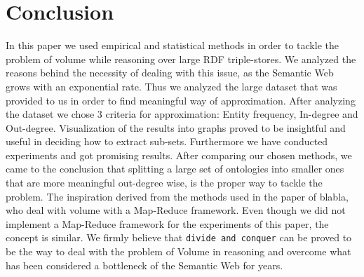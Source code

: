 \documentclass[runningheads,a4paper]{../../StyleFiles/llncs}
\begin{document}
\section{Conclusion}
In this paper we used empirical and statistical methods in order to tackle the problem of volume while reasoning over large RDF triple-stores. We analyzed the reasons behind the necessity of dealing with this issue, as the Semantic Web grows with an exponential rate. Thus we analyzed the large dataset that was provided to us in order to find meaningful way of approximation. After analyzing the dataset we chose 3 criteria for approximation: Entity frequency, In-degree and Out-degree. Visualization of the results into graphs proved to be insightful and useful in deciding how to extract sub-sets. 
Furthermore we have conducted experiments and got promising results. After comparing our chosen methods, we came to the conclusion that splitting a large set of ontologies into smaller ones that are more meaningful out-degree wise, is the proper way to tackle the problem. The inspiration derived from the methods used in the paper of blabla, who deal with volume with a Map-Reduce framework. Even though we did not implement a Map-Reduce framework for the experiments of this paper, the concept is similar. 
We firmly believe that \texttt{divide and conquer}  can be proved to be the way to deal with the problem of Volume in reasoning and overcome what has been considered a bottleneck of the Semantic Web for years.



\end{document}
